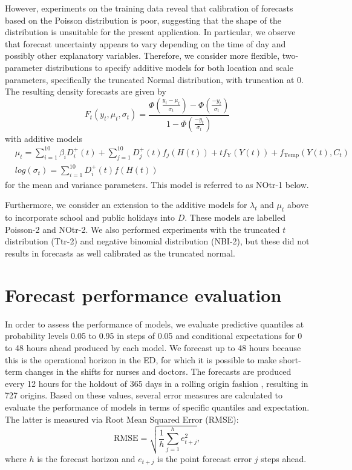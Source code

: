 \documentclass[]{elsarticle} %
\begin{document}
However, experiments on the training data reveal that calibration of forecasts based on the Poisson distribution is poor, suggesting that the shape of the distribution is unsuitable for the present application. In particular, we observe that forecast uncertainty appears to vary depending on the time of day and possibly other explanatory variables. Therefore, we consider more flexible, two-parameter distributions to specify additive models for both location and scale parameters, specifically the truncated Normal distribution, with truncation at 0. The resulting density forecasts are given by
\begin{equation}
F_t(y_t,\mu_t,\sigma_t) =  \frac{\Phi\left( \frac{y_t-\mu_t}{\sigma_t} \right) - \Phi\left( \frac{-y_t}{\sigma_t} \right)}{1 - \Phi\left( \frac{-y_t}{\sigma_t} \right)}
\label{eq:truncatedn}
\end{equation}
with additive models
\begin{align*}
    & \mu_t = \sum_{i=1}^{10} \beta_i D^{+}_i(t) + \sum_{j=1}^{10} D^{+}_j(t) f_j(H(t)) + t f_\text{Y}(Y(t)) + f_\text{Temp}(Y(t),C_t) \\
    & log(\sigma_t) = \sum_{i=1}^{10} D^{+}_i(t) f(H(t))
\end{align*}
for the mean and variance parameters. This model is referred to as NOtr-1 below.

Furthermore, we consider an extension to the additive models for \(\lambda_t\) and \(\mu_t\) above to incorporate school and public holidays into \(D\). These models are labelled Poisson-2 and NOtr-2. We also performed experiments with the truncated \(t\) distribution (Ttr-2) and negative binomial distribution (NBI-2), but these did not results in forecasts as well calibrated as the truncated normal.

\hypertarget{accuracy}{%
\section{Forecast performance evaluation}\label{accuracy}}

In order to assess the performance of models, we evaluate predictive quantiles at probability levels 0.05 to 0.95 in steps of 0.05 and conditional expectations for 0 to 48 hours ahead produced by each model. We forecast up to 48 hours because this is the operational horizon in the ED, for which it is possible to make short-term changes in the shifts for nurses and doctors. The forecasts are produced every 12 hours for the holdout of 365 days in a rolling origin fashion \citep{Tashman2000}, resulting in 727 origins. Based on these values, several error measures are calculated to evaluate the performance of models in terms of specific quantiles and expectation. The latter is measured via Root Mean Squared Error (RMSE):
\begin{equation}
  \mathrm{RMSE} = \sqrt{\frac{1}{h} \sum_{j=1}^h e_{t+j}^2} ,
  \label{eq:RMSE}
\end{equation}
where \(h\) is the forecast horizon and \(e_{t+j}\) is the point forecast error \(j\) steps ahead.
\end{document}

